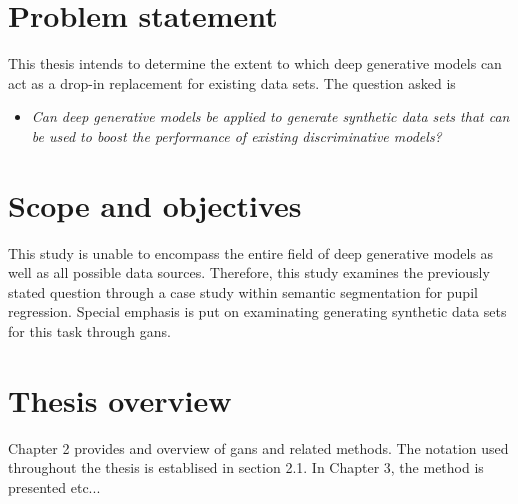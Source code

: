 \section{Problem statement}
This thesis intends to determine the extent to which deep generative models can act as a drop-in replacement for existing data sets. The question asked is

\begin{itemize}
    \item \textit{Can deep generative models be applied to generate synthetic data sets that can be used to boost the performance of existing discriminative models?}
\end{itemize}


\section{Scope and objectives}
This study is unable to encompass the entire field of deep generative models as well as all possible data sources. Therefore, this study examines the previously stated question through a case study within semantic segmentation for pupil regression. Special emphasis is put on examinating generating synthetic data sets for this task through \acrlong{gans}.

\section{Thesis overview}
Chapter 2 provides and overview of \acrlong{gans} and related methods. The notation used throughout the thesis is establised in section 2.1. In Chapter 3, the method is presented etc...



